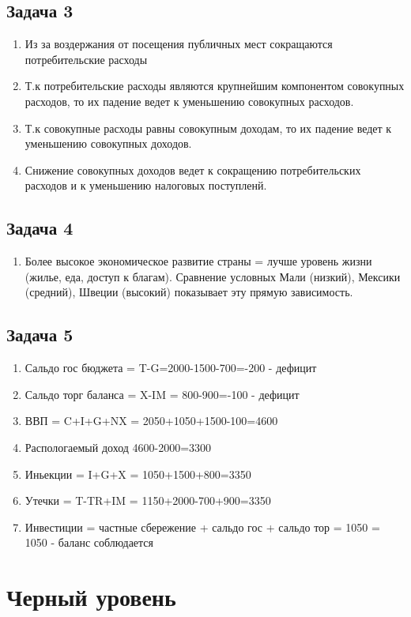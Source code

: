 \documentclass[a4paper,12pt]{article}
\begin{document}
\subsection{Задача 3}
\begin{enumerate}
    \item Из за воздержания от посещения публичных мест сокращаются потребительские расходы
    \item Т.к потребительские расходы являются крупнейшим компонентом совокупных расходов, то их падение ведет к уменьшению совокупных расходов.
    \item Т.к совокупные расходы равны совокупным доходам, то их падение ведет к уменьшению совокупных доходов.
    \item Снижение совокупных доходов ведет к сокращению потребительских расходов и к уменьшению налоговых поступленй.
\end{enumerate}

\subsection{Задача 4}
\begin{enumerate}
    \item Более высокое экономическое развитие страны = лучше уровень жизни (жилье, еда, доступ к благам). Сравнение условных Мали (низкий), Мексики (средний), Швеции (высокий) показывает эту прямую зависимость.
\end{enumerate}

\subsection{Задача 5}
\begin{enumerate}
    \item Сальдо гос бюджета = T-G=2000-1500-700=-200 - дефицит
    \item Сальдо торг баланса = X-IM = 800-900=-100 - дефицит
    \item ВВП = C+I+G+NX = 2050+1050+1500-100=4600
    \item Распологаемый доход 4600-2000=3300
    \item Иньекции = I+G+X = 1050+1500+800=3350
    \item Утечки = T-TR+IM = 1150+2000-700+900=3350
    \item Инвестиции = частные сбережение + сальдо гос + сальдо тор = 1050 = 1050 - баланс соблюдается
\end{enumerate}

\section{Черный уровень}
\end{document}
